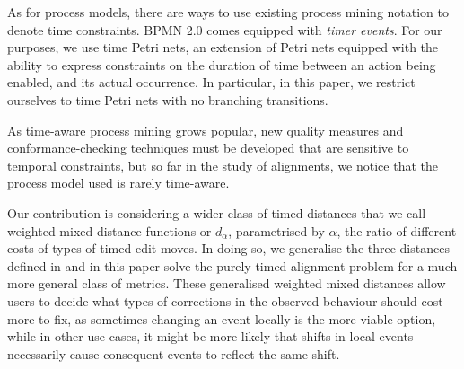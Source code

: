 \documentclass[runningheads]{llncs}
\newcounter{cases}
\begin{document}
As for process models, there are ways to use existing process mining notation to denote time constraints. BPMN 2.0 comes equipped with \emph{timer events}. 
    For our purposes, we use time Petri nets, an extension of Petri nets equipped with the ability to express constraints on the duration of time between an action being enabled, and its actual occurrence. 
    In particular, in this paper, we restrict ourselves to time Petri nets with \color{secondrevision}no branching transitions. \color{black}
    
    As time-aware process mining grows popular, new quality measures and conformance-checking techniques must be developed that are sensitive to temporal constraints, but so far in the study of alignments, we notice that the process model used is rarely time-aware. 
    
    Our contribution is considering a wider class of timed distances that we call weighted mixed distance functions or $d_{\alpha}$, parametrised by $\alpha$, the ratio of different costs of types of timed edit moves. 
    In doing so, we generalise the three distances defined in \cite{CR22} and in this paper solve the purely timed alignment problem for a much more general class of metrics. 
These generalised weighted mixed distances allow users to decide what types of corrections in the observed behaviour should cost more to fix, as sometimes changing an event locally is the more viable option, while in other use cases, it might be more likely that shifts in local events necessarily cause consequent events to reflect the same shift. 
    
    
\end{document}
